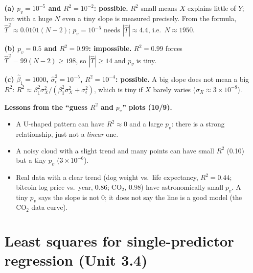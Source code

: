 \documentclass[11pt]{article}
\begin{document}
\begin{examplebox}[title={Question (10/9): which scenarios are possible? ($p_v$ is for $H_0:\beta_1=0$, $N>3$)}]
\textbf{(a) $p_v=10^{-5}$ and $R^2=10^{-2}$: possible.} $R^2$ small means $X$ explains little of $Y$; but with a huge $N$ even a tiny
slope is measured precisely. From the formula, $\hat T^2\approx0.0101(N-2)$; $p_v=10^{-5}$ needs $|\hat T|\approx4.4$, i.e.\ $N\approx1950$.

\textbf{(b) $p_v=0.5$ and $R^2=0.99$: impossible.} $R^2=0.99$ forces $\hat T^2=99(N-2)\ge198$, so $|\hat T|\ge14$ and $p_v$ is tiny.

\textbf{(c) $\hat\beta_1=1000$, $\hat\sigma_\epsilon^2=10^{-5}$, $R^2=10^{-4}$: possible.} A big slope does not mean a big $R^2$:
$R^2\approx\beta_1^2\sigma_X^2/(\beta_1^2\sigma_X^2+\sigma_\epsilon^2)$, which is tiny if $X$ barely varies ($\sigma_X\approx3\times10^{-8}$).
\end{examplebox}

\textbf{Lessons from the ``guess $R^2$ and $p_v$'' plots (10/9).}
\begin{itemize}[leftmargin=*,itemsep=2pt]
\item A U-shaped pattern can have $R^2\approx0$ and a large $p_v$: there is a strong relationship, just not a \emph{linear} one.
\item A noisy cloud with a slight trend and many points can have small $R^2$ (0.10) but a tiny $p_v$ ($3\times10^{-6}$).
\item Real data with a clear trend (dog weight vs.\ life expectancy, $R^2=0.44$; bitcoin log price vs.\ year, $0.86$; CO$_2$, $0.98$) have
astronomically small $p_v$. A tiny $p_v$ says the slope is not $0$; it does not say the line is a good model (the CO$_2$ data curve).
\end{itemize}

\section{Least squares for single-predictor regression (Unit 3.4)}\label{sec:ls}
\end{document}
